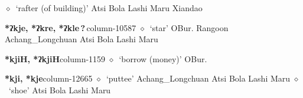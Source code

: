          $\diamond$~`rafter (of building)'
         Atsi 
\hspace{1ex}
         Bola 
\hspace{1ex}
         Lashi 
\hspace{1ex}
         Maru 
\hspace{1ex}
         Xiandao 
  \item {\footnotesize \textbf{*ʔkje, *ʔkre, *ʔkle\,?\,}}{\tiny column-10587}
         $\diamond$~`star'
         OBur. 
\hspace{1ex}
         Rangoon 
\hspace{1ex}
         Achang\_Longchuan 
\hspace{1ex}
         Atsi 
\hspace{1ex}
         Bola 
\hspace{1ex}
         Lashi 
\hspace{1ex}
         Maru 
  \item {\footnotesize \textbf{*kjiH, *ʔkjiH}}{\tiny column-1159}
         $\diamond$~`borrow (money)'
         OBur. 
  \item {\footnotesize \textbf{*kji, *kje}}{\tiny column-12665}
         $\diamond$~`puttee'
         Achang\_Longchuan 
\hspace{1ex}
         Atsi 
\hspace{1ex}
         Bola 
\hspace{1ex}
         Lashi 
\hspace{1ex}
         Maru 
\hspace{1ex}
         $\diamond$~`shoe'
         Atsi 
\hspace{1ex}
         Bola 
\hspace{1ex}
         Lashi 
\hspace{1ex}
         Maru 
